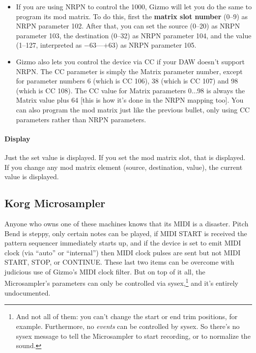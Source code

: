 \documentclass{article}
\begin{document}
\begin{itemize}
\item If you are using NRPN to control the 1000, Gizmo will let you do the same to program its mod matrix.  To do this, first the {\bf matrix slot number} (0--9) as NRPN parameter 102.  After that, you can set the source (0--20) as NRPN parameter 103, the destination (0--32) as NRPN parameter 104, and the value (1--127, interpreted as \(-63\)---\(+63\)) as NRPN parameter 105.
\item Gizmo also lets you control the device via CC if your DAW doesn't support NRPN.  The CC parameter is simply the Matrix parameter number, except for parameter numbers 6 (which is CC 106), 38 (which is CC 107) and 98 (which is CC 108).  The CC value for Matrix parameters 0...98 is always the Matrix value plus 64 [this is how it's done in the NRPN mapping too].  You can also program the mod matrix just like the previous bullet, only using CC parameters rather than NRPN parameters.
\end{itemize}

\paragraph{Display} Just the set value is displayed.  If you set the mod matrix slot, that is displayed.  If you change any mod matrix element (source, destination, value), the current value is displayed.


\subsection{Korg Microsampler}  Anyone who owns one of these machines knows that its MIDI is a disaster.  Pitch Bend is steppy, only certain notes can be played, if MIDI START is received the pattern sequencer immediately starts up, and if the device is set to emit MIDI clock (via ``auto'' or ``internal'') then MIDI clock pulses are sent but not MIDI START, STOP, or CONTINUE.  These last two items can be overcome with judicious use of Gizmo's MIDI clock filter.  But on top of it all, the Microsampler's parameters can only be controlled via sysex,\footnote{And not all of them: you can't change the start or end trim positions, for example.  Furthermore, no {\it events} can be controlled by sysex.  So there's no sysex message to tell the Microsampler to start recording, or to normalize the sound.} and it's entirely undocumented. 
\end{document}
